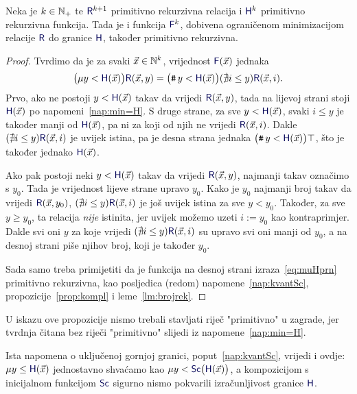 \begin{propozicija}[{name=[ograničena minimizacija čuva primitivnu rekurzivnost]}]\label{prop:muHprn}
Neka je $k\in{\mathbb N}_+$ te $\f R^{k+1}$\! primitivno rekurzivna relacija i $\f H^k$ primitivno rekurzivna funkcija. Tada je i funkcija $\f F^k$\!, dobivena ograničenom minimizacijom relacije $\f R$ do granice $\f H$, također primitivno rekurzivna.
\end{propozicija}
\begin{proof}
Tvrdimo da je za svaki $\vec x\in{\mathbb N}^k$, vrijednost $\f F(\vec x)$ jednaka
    \begin{equation}\label{eq:muHprn}
        \bigl(\mu y<\f H(\vec x)\bigr)\f R(\vec x,y)
        =
        \bigl(\num y<\f H(\vec x)\bigr)(\nexists i\le y)\f R(\vec x,i).
    \end{equation}
Prvo, ako ne postoji $y<\f H(\vec x)$ takav da vrijedi $\f R(\vec x,y)$, tada na lijevoj strani stoji $\f H(\vec x)$ po napomeni~\ref{nap:min=H}. S druge strane, za sve $y<\f H(\vec x)$, svaki $i\le y$ je također manji od $\f H(\vec x)$, pa ni za koji od njih ne vrijedi $\f R(\vec x,i)$. Dakle $(\nexists i\le y)\f R(\vec x,i)$ je uvijek istina, pa je desna strana jednaka $\bigl(\num y<\f H(\vec x)\bigr)\top$, što je također jednako $\f H(\vec x)$.
    
Ako pak postoji neki $y<\f H(\vec x)$ takav da vrijedi $\f R(\vec x,y)$, najmanji takav označimo s $y_0$. Tada je vrijednost lijeve strane upravo $y_0$. Kako je $y_0$ najmanji broj takav da vrijedi $\f R(\vec x,y_0)$, $(\nexists i\le y)\f R(\vec x,i)$ je još uvijek istina za sve $y<y_0$. Također, za sve $y\ge y_0$, ta relacija \emph{nije} istinita, jer uvijek možemo uzeti $i:=y_0$ kao kontraprimjer. Dakle svi oni $y$ za koje vrijedi $(\nexists i\le y)\f R(\vec x,i)$ su upravo svi oni manji od $y_0$, a na desnoj strani piše njihov broj, koji je također $y_0$.
 
Sada samo treba primijetiti da je funkcija na desnoj strani izraza~\eqref{eq:muHprn} primitivno rekurzivna, kao posljedica (redom) napomene~\ref{nap:kvantSc}, propozicije~\ref{prop:kompl} i leme~\ref{lm:brojrek}.
\end{proof}
U iskazu ove propozicije nismo trebali stavljati riječ "primitivno" u zagrade, jer tvrdnja čitana bez riječi "primitivno" slijedi iz napomene~\ref{nap:min=H}.

\begin{napomena}[{name=[uključena gornja granica ograničene minimizacije]}]\label{nap:muSc}
Ista napomena o uključenoj gornjoj granici, poput~\ref{nap:kvantSc}, vrijedi i ovdje:
$\mu y\le\f H(\vec x)$ jednostavno shvaćamo kao $\mu y<\f{Sc}\bigl(\f H(\vec x)\bigr)$, a kompozicijom s inicijalnom funkcijom $\f{Sc}$ sigurno nismo pokvarili izračunljivost granice $\f H$.
\end{napomena}
